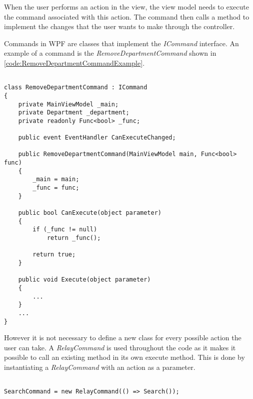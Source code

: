 When the user performs an action in the view, the view model needs to execute the command associated with this action. The command then calls a method to implement the changes that the user wants to make through the controller. 
\par
Commands in WPF are classes that implement the \textit{ICommand} interface. An example of a command is the \textit{RemoveDepartmentCommand} shown in \autoref{code:RemoveDepartmentCommandExample}.

\begin{listing}[H]
\begin{verbatim}

class RemoveDepartmentCommand : ICommand
{
    private MainViewModel _main;
    private Department _department;
    private readonly Func<bool> _func;

    public event EventHandler CanExecuteChanged;

    public RemoveDepartmentCommand(MainViewModel main, Func<bool> func)
    {
        _main = main;
        _func = func;
    }

    public bool CanExecute(object parameter)
    {
        if (_func != null)
            return _func();

        return true;
    }

    public void Execute(object parameter)
    {
        ...
    }
    ...
}

\end{verbatim}
\label{code:RemoveDepartmentCommandExample}
\end{listing}

However it is not necessary to define a new class for every possible action the user can take. A \textit{RelayCommand} is used throughout the code as it makes it possible to call an existing method in its own execute method. This is done by instantiating a \textit{RelayCommand} with an action as a parameter.

\begin{listing}[H]
\begin{verbatim}

SearchCommand = new RelayCommand(() => Search());

\end{verbatim}
\label{code:RelayCommandExample}
\end{listing}

